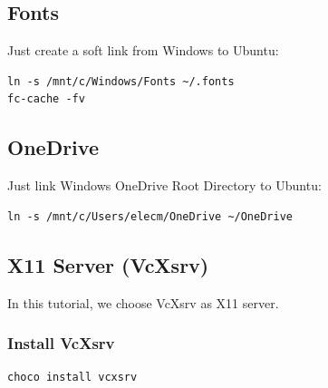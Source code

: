 \documentclass[10pt]{article}
\begin{document}
\subsection{Fonts}
\label{sec:org0bfb6e0}
Just create a soft link from Windows to Ubuntu:
\begin{verbatim}
ln -s /mnt/c/Windows/Fonts ~/.fonts
fc-cache -fv
\end{verbatim}

\subsection{OneDrive}
\label{sec:org02d82f9}
Just link Windows OneDrive Root Directory to Ubuntu:
\begin{verbatim}
ln -s /mnt/c/Users/elecm/OneDrive ~/OneDrive
\end{verbatim}

\subsection{X11 Server (VcXsrv)}
\label{sec:org962fdbf}
In this tutorial, we choose VcXsrv as X11 server.

\subsubsection{Install VcXsrv}
\label{sec:org9bb69ed}
\begin{verbatim}
choco install vcxsrv
\end{verbatim}
\end{document}
